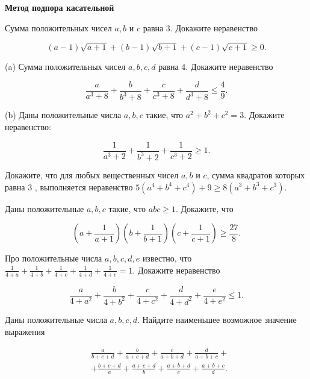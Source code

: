 \centerline{\bf \Huge Метод подпора касательной}

\begin{flushright}
        \scriptsize{}
\end{flushright}

Сумма положительных чисел $a, b$ и $c$ равна 3. Докажите неравенство

$$
(a-1) \sqrt{a+1}+(b-1) \sqrt{b+1}+(c-1) \sqrt{c+1} \geqslant 0 .
$$

(a) Сумма положительных чисел $a, b, c, d$ равна 4. Докажите неравенство

$$
\frac{a}{a^3+8}+\frac{b}{b^3+8}+\frac{c}{c^3+8}+\frac{d}{d^3+8} \leqslant \frac{4}{9} .
$$

\noindent
(b) Даны положительные числа $a, b, c$ такие, что $a^2+b^2+c^2=3$. Докажите неравенство:

$$
\frac{1}{a^3+2}+\frac{1}{b^3+2}+\frac{1}{c^3+2} \geqslant 1 .
$$

Докажите, что для любых вещественных чисел $a, b$ и $c$, сумма квадратов которых равна 3 , выполняется неравенство $5\left(a^4+b^4+c^4\right)+9 \geqslant 8\left(a^3+b^3+c^3\right)$.

Даны положительные $a, b, c$ такие, что $a b c \geqslant 1$. Докажите, что

$$
\left(a+\frac{1}{a+1}\right)\left(b+\frac{1}{b+1}\right)\left(c+\frac{1}{c+1}\right) \geqslant \frac{27}{8} .
$$

Про положительные числа $a, b, c, d, e$ известно, что $\frac{1}{4+a}+\frac{1}{4+b}+\frac{1}{4+c}+\frac{1}{4+d}+\frac{1}{4+e}=1$. Докажите неравенство

$$
\frac{a}{4+a^2}+\frac{b}{4+b^2}+\frac{c}{4+c^2}+\frac{d}{4+d^2}+\frac{e}{4+e^2} \leqslant 1 .
$$

Даны положительные числа $a, b, c, d$. Найдите наименьшее возможное значение выражения

$$
\begin{aligned}
& \frac{a}{b+c+d}+\frac{b}{a+c+d}+\frac{c}{a+b+d}+\frac{d}{a+b+c}+ \\
& +\frac{b+c+d}{a}+\frac{a+c+d}{b}+\frac{a+b+d}{c}+\frac{a+b+c}{d} .
\end{aligned}
$$